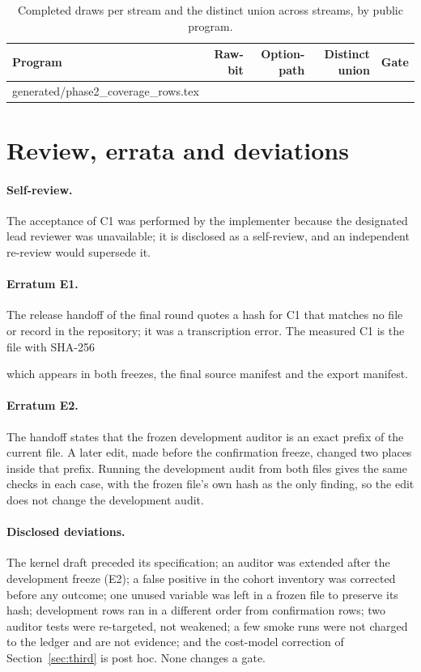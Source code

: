 \documentclass[11pt,a4paper]{article}
\makeatletter
\newcommand{\tableinput}[1]{\@@input #1 }
\makeatother
\begin{document}
\begin{table}[htbp]\centering\small
\begin{tabularx}{\linewidth}{Xrrrl}\toprule
Program & Raw-bit & Option-path & Distinct union & Gate\\\midrule
\tableinput{generated/phase2_coverage_rows.tex}
\bottomrule\end{tabularx}
\caption{Completed draws per stream and the distinct union across streams, by
public program.}\label{tab:feasibility}
\end{table}

\section{Review, errata and deviations}\label{sec:errata}

\paragraph{Self-review.} The acceptance of C1 was performed by the implementer
because the designated lead reviewer was unavailable; it is disclosed as a
self-review, and an independent re-review would supersede it.

\paragraph{Erratum E1.} The release handoff of the final round quotes a hash for C1
that matches no file or record in the repository; it was a transcription error.
The measured C1 is the file with SHA-256
\par{}\par\noindent which appears in both
freezes, the final source manifest and the export manifest.

\paragraph{Erratum E2.} The handoff states that the frozen development auditor is
an exact prefix of the current file. A later edit, made before the confirmation
freeze, changed two places inside that prefix. Running the development audit from
both files gives the same  checks in each case, with the frozen file's
own hash as the only finding, so the edit does not change the development audit.

\paragraph{Disclosed deviations.} The kernel draft preceded its specification; an
auditor was extended after the development freeze (E2); a false positive in the
cohort inventory was corrected before any outcome; one unused variable was left in
a frozen file to preserve its hash; development rows ran in a different order from
confirmation rows; two auditor tests were re-targeted, not weakened; a few smoke
runs were not charged to the ledger and are not evidence; and the cost-model
correction of Section~\ref{sec:third} is post hoc. None changes a gate.
\end{document}

